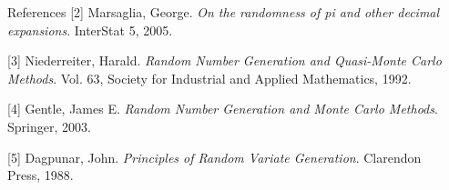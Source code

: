 \documentclass[final]{beamer}
\newlength{\sepwidth}
\newlength{\colwidth}
\newcommand{\separatorcolumn}{\begin{column}{\sepwidth}\end{column}}
\begin{document}
\begin{frame}[t]
\begin{columns}[t]
\begin{column}{\colwidth}
\begin{block}{References}
    [2] Marsaglia, George. \textsl{On the randomness of pi and other decimal expansions}. InterStat 5, 2005.
    
    [3] Niederreiter, Harald. \textsl{Random Number Generation and Quasi-Monte Carlo Methods}. Vol. 63, Society for Industrial and Applied Mathematics, 1992.
    
    [4] Gentle, James E. \textsl{Random Number Generation and Monte Carlo Methods}. Springer, 2003.
    
    [5] Dagpunar, John. \textsl{Principles of Random Variate Generation}. Clarendon Press, 1988.
    \nocite{*}
    \footnotesize{}

  \end{block}

\end{column}
\separatorcolumn
\end{columns}
\end{frame}
\end{document}
